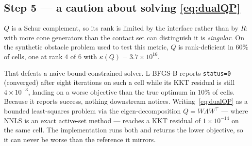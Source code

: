 \documentclass[11pt,a4paper]{article}
\begin{document}
\subsection*{Step 5 --- a caution about solving \eqref{eq:dualQP}}
$Q$ is a Schur complement, so its rank is limited by the interface rather than by $R$:
with more cone generators than the contact set can distinguish it is \emph{singular}. On
the synthetic obstacle problem used to test this metric, $Q$ is rank-deficient in $60\%$ of
cells, one at rank $4$ of $6$ with $\kappa(Q)=3.7\times10^{16}$.

That defeats a naive bound-constrained solver. L-BFGS-B reports \texttt{status=0}
(converged) after eight iterations on such a cell while its KKT residual is still
$4\times10^{-3}$, landing on a worse objective than the true optimum in $10\%$ of cells.
Because it reports success, nothing downstream notices. Writing~\eqref{eq:dualQP} as a
bounded least-squares problem via the eigen-decomposition $Q=W\Lambda W^{\!\top}$ --- where
NNLS is an exact active-set method --- reaches a KKT residual of $1\times10^{-14}$ on the
same cell. The implementation runs both and returns the lower objective, so it can never
be worse than the reference it mirrors.
\end{document}
